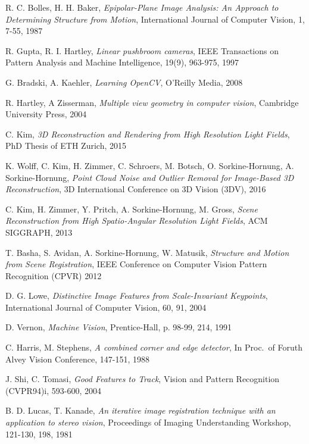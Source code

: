 \documentclass[11pt, english, singlespacing, headsepline, ]{MastersDoctoralThesis}
\theoremstyle{definition}
\begin{document}
\begin{thebibliography}{90}
	R. C. Bolles, H. H. Baker,
	\emph{Epipolar-Plane Image Analysis: An Approach to Determining Structure from Motion},
	International Journal of Computer Vision, 1, 7-55,
	1987

	R. Gupta, R. I. Hartley, 
	\emph{Linear pushbroom cameras},
	IEEE Transactions on Pattern Analysis and Machine Intelligence, 19(9), 963-975,
	1997

	G. Bradski, A. Kaehler,
	\emph{Learning OpenCV},
	O'Reilly Media, 2008

	R. Hartley, A Zisserman,
	\emph{Multiple view geometry in computer vision},
	Cambridge University Press,
	2004

	C. Kim, 
	\emph{3D Reconstruction and Rendering from High Resolution Light Fields},
	PhD Thesis of ETH Zurich, 2015

	K. Wolff, C. Kim, H. Zimmer, C. Schroers, M. Botsch, O. Sorkine-Hornung, A. Sorkine-Hornung,
	\emph{Point Cloud Noise and Outlier Removal for Image-Based 3D Reconstruction},
	3D International Conference on 3D Vision (3DV), 2016

	C. Kim, H. Zimmer, Y. Pritch, A. Sorkine-Hornung, M. Gross,
	\emph{Scene Reconstruction from High Spatio-Angular Resolution Light Fields},
	ACM SIGGRAPH, 2013

	T. Basha, S. Avidan, A. Sorkine-Hornung, W. Matusik,
	\emph{Structure and Motion from Scene Registration},
	IEEE Conference on Computer Vision Pattern Recognition (CPVR) 2012
	
	D. G. Lowe,
	\emph{Distinctive Image Features from Scale-Invariant Keypoints},
	International Journal of Computer Vision, 60, 91,
	2004 

	D. Vernon,
	\emph{Machine Vision},
	Prentice-Hall, p. 98-99, 214,
	1991
	
	C. Harris, M. Stephens, 
	\emph{A combined corner and edge detector},
	In Proc.\ of Foruth Alvey Vision Conference, 147-151,
	1988

	J. Shi, C. Tomasi,
	\emph{Good Features to Track},
	Vision and Pattern Recognition (CVPR94)i, 593-600,
	2004

	B. D. Lucas, T. Kanade,
	\emph{An iterative image registration technique with an application to stereo vision},
	Proceedings of Imaging Understanding Workshop, 121-130,
	198,
	1981

\end{thebibliography}

\end{document}
